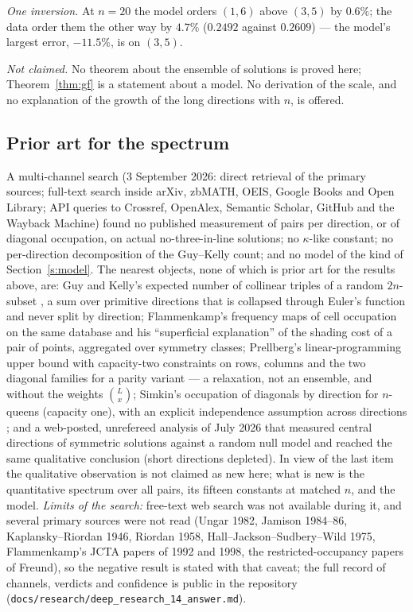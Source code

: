 \documentclass[11pt,a4paper]{article}
\begin{document}
\emph{One inversion.}  At $n=20$ the model orders $(1,6)$ above $(3,5)$ by $0.6\%$; the data order them the other way by
$4.7\%$ ($0.2492$ against $0.2609$) --- the model's largest error, $-11.5\%$, is on $(3,5)$.

\emph{Not claimed.}  No theorem about the ensemble of solutions is proved here; Theorem~\ref{thm:gf} is a statement
about a model.  No derivation of the scale, and no explanation of the growth of the long directions with $n$, is
offered.

\subsection{Prior art for the spectrum}\label{s:prior2d}
A multi-channel search (3 September 2026: direct retrieval of the primary sources; full-text search inside arXiv, zbMATH, OEIS,
Google Books and Open Library; API queries to Crossref, OpenAlex, Semantic Scholar, GitHub and the Wayback Machine)
found no published measurement of pairs per direction, or of diagonal occupation, on actual no-three-in-line solutions;
no $\kappa$-like constant; no per-direction decomposition of the Guy--Kelly count; and no model of the kind of
Section~\ref{s:model}.  The nearest objects, none of which is prior art for the results above, are: Guy and Kelly's expected number
of collinear triples of a random $2n$-subset \cite{GuyKelly}, a sum over primitive directions that is collapsed through
Euler's function and never split by direction; Flammenkamp's frequency maps of cell occupation on the same database
\cite{Density} and his ``superficial explanation'' of the shading cost of a pair of points, aggregated over symmetry
classes; Prellberg's linear-programming upper bound with capacity-two constraints on rows, columns and the two diagonal
families for a parity variant \cite{PrellbergCB} --- a relaxation, not an ensemble, and without the weights
$\binom{L}{x}$; Simkin's occupation of diagonals by direction for $n$-queens (capacity one), with an explicit independence
assumption across directions \cite{Simkin}; and a web-posted, unrefereed analysis of July 2026 \cite{Du} that measured
central directions of symmetric solutions against a random null model and reached the same qualitative conclusion
(short directions depleted).  In view of the last item the qualitative observation is not claimed as new here; what is
new is the quantitative spectrum over all pairs, its fifteen constants at matched $n$, and the model.
\emph{Limits of the search:} free-text web search was not available during it, and several primary sources were not
read (Ungar 1982, Jamison 1984--86, Kaplansky--Riordan 1946, Riordan 1958, Hall--Jackson--Sudbery--Wild 1975,
Flammenkamp's JCTA papers of 1992 and 1998, the restricted-occupancy papers of Freund), so the negative result is stated
with that caveat; the full record of channels, verdicts and confidence is public in the repository
(\texttt{docs/research/deep\_research\_14\_answer.md}).
\end{document}
